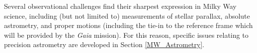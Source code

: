 Several observational challenges find their sharpest expression in
Milky Way science, including (but not limited to) measurements of
stellar parallax, absolute astrometry, and proper motions (including
the tie-in to the reference frame which will be provided by the {\it
  Gaia} mission). For this reason, specific issues relating to
precision astrometry are developed in Section \ref{MW_Astrometry}.








%
%
%
%
%
%
